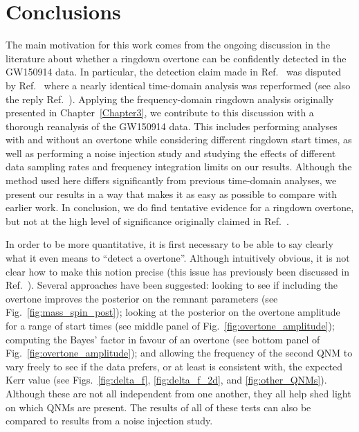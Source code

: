 \section{Conclusions}\label{ch4:sec:discussion}

The main motivation for this work comes from the ongoing discussion in the literature about whether a ringdown overtone can be confidently detected in the GW150914 data. 
In particular, the detection claim made in Ref.~\cite{Isi:2019aib} was disputed by Ref.~\cite{Cotesta:2022pci} where a nearly identical time-domain analysis was reperformed (see also the reply Ref.~\cite{Isi:2022mhy}).
Applying the frequency-domain ringdown analysis originally presented in Chapter~\ref{Chapter3}, we contribute to this discussion with a thorough reanalysis of the GW150914 data. 
This includes performing analyses with and without an overtone while considering different ringdown start times, as well as performing a noise injection study and studying the effects of different data sampling rates and frequency integration limits on our results.
Although the method used here differs significantly from previous time-domain analyses, we present our results in a way that makes it as easy as possible to compare with earlier work.
In conclusion, we do find tentative evidence for a ringdown overtone, but not at the high level of significance originally claimed in Ref.~\cite{Isi:2019aib}.

In order to be more quantitative, it is first necessary to be able to say clearly what it even means to ``detect a overtone''. 
Although intuitively obvious, it is not clear how to make this notion precise (this issue has previously been discussed in Ref.~\cite{Isi:2022mhy}). 
Several approaches have been suggested: looking to see if including the overtone improves the posterior on the remnant parameters (see Fig.~\ref{fig:mass_spin_post}); looking at the posterior on the overtone amplitude for a range of start times (see middle panel of Fig.~\ref{fig:overtone_amplitude}); computing the Bayes' factor in favour of an overtone (see bottom panel of Fig.~\ref{fig:overtone_amplitude}); and allowing the frequency of the second QNM to vary freely to see if the data prefers, or at least is consistent with, the expected Kerr value (see Figs.~\ref{fig:delta_f}, \ref{fig:delta_f_2d}, and \ref{fig:other_QNMs}).
Although these are not all independent from one another, they all help shed light on which QNMs are present. 
The results of all of these tests can also be compared to results from a noise injection study.

